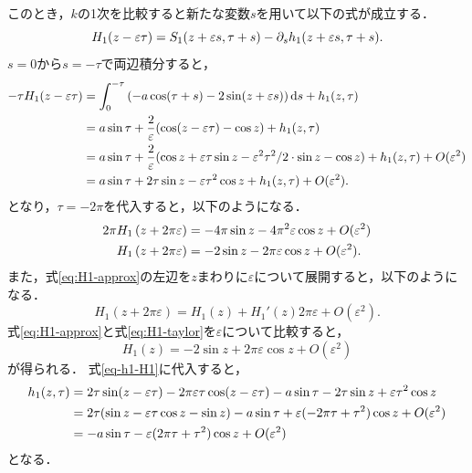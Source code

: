 \documentclass[../main]{subfiles}
\begin{document}
    このとき，$k$の1次を比較すると新たな変数$s$を用いて以下の式が成立する．
    \begin{equation}
        H_1(z-\varepsilon \tau)=S_1(z+\varepsilon s,\tau+s)-\partial_s h_1(z+\varepsilon s,\tau+s).
    \end{equation}
    $s=0$から$s=-\tau$で両辺積分すると，
    \begin{align}
        -\tau H_1(z-\varepsilon \tau)&=\int_0^{-\tau}\left(-a\cos(\tau+s)-2\sin(z+\varepsilon s)\right)\dd{s}+h_1(z,\tau)\notag \\
        &=a \sin\tau+\frac{2}{\varepsilon}(\cos (z-\varepsilon \tau)-\cos  z)+h_1(z,\tau)\notag\\
        &=a \sin\tau+\frac{2}{\varepsilon}(\cos z+\varepsilon \tau\sin z-\varepsilon^2\tau^2/2\cdot\sin z-\cos z)+h_1(z,\tau)+O(\varepsilon^2)\notag\\
        &=a \sin\tau+2\tau\sin z-\varepsilon \tau^2\cos z+h_1(z,\tau)+O(\varepsilon^2).
        \label{eq-h1-H1}
    \end{align}
    となり，$\tau=-2\pi$を代入すると，以下のようになる．
    \begin{align}
        2\pi H_1\left(z+ 2\pi\varepsilon\right)&=-4\pi\sin z-4\pi^2\varepsilon \cos z+O(\varepsilon^2)\notag\\
        H_1\left(z+ 2\pi\varepsilon\right)&=-2 \sin z-2\pi\varepsilon \cos z+O(\varepsilon^2).\label{eq:H1-approx}
    \end{align}
    また，式\eqref{eq:H1-approx}の左辺を$z$まわりに$\varepsilon$について展開すると，以下のようになる．
    \begin{equation}
        H_1\left(z+2\pi\varepsilon\right)=H_1(z)+H_1'(z) 2\pi\varepsilon+O(\varepsilon^2).
        \label{eq:H1-taylor}
    \end{equation}
    式\eqref{eq:H1-approx}と式\eqref{eq:H1-taylor}を$\varepsilon$について比較すると，
    \begin{equation}
        \label{eq:nit-H1}
        H_1(z)=-2\sin z+2\pi\varepsilon \cos z+O(\varepsilon^2)
    \end{equation}
    が得られる．
    式\eqref{eq-h1-H1}に代入すると，
    \begin{align}
        h_1(z,\tau)&=2\tau\sin(z-\varepsilon \tau)-2\pi\varepsilon \tau\cos(z-\varepsilon \tau)-a\sin\tau-2\tau\sin z+\varepsilon \tau^2\cos z\notag\\
        &=2\tau(\sin z-\varepsilon \tau\cos z-\sin z)-a\sin\tau+\varepsilon(-2\pi \tau+\tau^2)\cos z+O(\varepsilon^2)\notag\\
        &=-a\sin\tau-\varepsilon(2\pi \tau+\tau^2)\cos z+O(\varepsilon^2)
    \end{align}
    となる．
\end{document}
